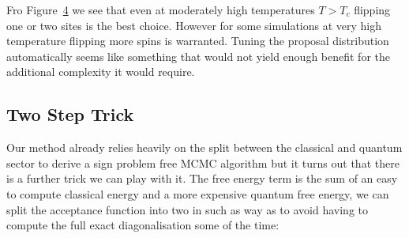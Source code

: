 Fro Figure~\protect\hyperlink{fig:comparison}{4} we see that even at moderately high temperatures \(T > T_c\) flipping one or two sites is the best choice. However for some simulations at very high temperature flipping more spins is warranted. Tuning the proposal distribution automatically seems like something that would not yield enough benefit for the additional complexity it would require.

\hypertarget{two-step-trick-2}{%
\subsection{Two Step Trick}\label{two-step-trick-2}}

Our method already relies heavily on the split between the classical and quantum sector to derive a sign problem free MCMC algorithm but it turns out that there is a further trick we can play with it. The free energy term is the sum of an easy to compute classical energy and a more expensive quantum free energy, we can split the acceptance function into two in such as way as to avoid having to compute the full exact diagonalisation some of the time:

\begin{Shaded}
\begin{Highlighting}[]
\OperatorTok{=}

 
\OperatorTok{=}

\OperatorTok{=}
    \OperatorTok{{-}}\OperatorTok{*}\OperatorTok{\textless{}}\NormalTok{,}\NormalTok{):}
\OperatorTok{=}
    
        \OperatorTok{{-}}\OperatorTok{*}\OperatorTok{\textless{}}\NormalTok{,}\NormalTok{):}
\OperatorTok{=}
    
\OperatorTok{=}
    
\end{Highlighting}
\end{Shaded}

\begin{Shaded}
\begin{Highlighting}[]

\end{Highlighting}
\end{Shaded}
